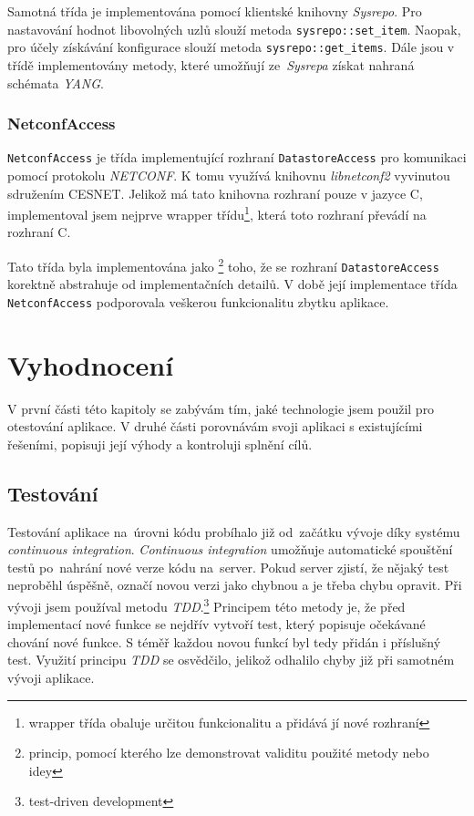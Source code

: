 \documentclass[thesis=B,czech,hidelinks]{FITthesis}[2019/03/06]
\newcommand{\Rplus}{\protect\hspace{-.1em}\protect\raisebox{.35ex}{\smaller{\smaller\textbf{+}}}}
\newcommand{\Cpp}{\mbox{C\Rplus\Rplus}\xspace}
\begin{document}
Samotná třída je implementována pomocí klientské knihovny \textit{Sysrepo}. Pro nastavování hodnot libovolných uzlů slouží metoda \texttt{sysrepo::set\_item}. Naopak, pro účely získávání konfigurace slouží metoda \texttt{sysrepo::get\_items}. Dále jsou v třídě implementovány metody, které umožňují ze~\textit{Sysrepa} získat nahraná schémata \textit{YANG}.


\subsection{NetconfAccess}
\texttt{NetconfAccess} je třída implementující rozhraní \texttt{DatastoreAccess} pro komunikaci pomocí protokolu \textit{NETCONF}. K tomu využívá knihovnu \textit{libnetconf2} vyvinutou sdružením CESNET\@. Jelikož má tato knihovna rozhraní pouze v jazyce C, implementoval jsem nejprve wrapper třídu\footnote{wrapper třída obaluje určitou funkcionalitu a přidává jí nové rozhraní}, která toto rozhraní převádí na rozhraní \Cpp{}.

Tato třída byla implementována jako \footnote{princip, pomocí kterého lze demonstrovat validitu použité metody nebo idey} toho, že se rozhraní \texttt{DatastoreAccess} korektně abstrahuje od implementačních detailů. V době její implementace třída \texttt{NetconfAccess} podporovala veškerou funkcionalitu zbytku aplikace.


\chapter{Vyhodnocení}
V první části této kapitoly se zabývám tím, jaké technologie jsem použil pro otestování aplikace. V druhé části porovnávám svoji aplikaci s existujícími řešeními, popisuji její výhody a kontroluji splnění cílů.

\section{Testování}
Testování aplikace na~úrovni kódu probíhalo již od~začátku vývoje díky systému \textit{continuous integration}. \textit{Continuous integration} umožňuje automatické spouštění testů po~nahrání nové verze kódu na~server. Pokud server zjistí, že nějaký test neproběhl úspěšně, označí novou verzi jako chybnou a je třeba chybu opravit. Při vývoji jsem používal metodu \textit{TDD}.\footnote{test-driven development} Principem této metody je, že před implementací nové funkce se nejdřív vytvoří test, který popisuje očekávané chování nové funkce. S téměř každou novou funkcí byl tedy přidán i příslušný test. Využití principu \textit{TDD} se osvědčilo, jelikož odhalilo chyby již při samotném vývoji aplikace.
\end{document}
